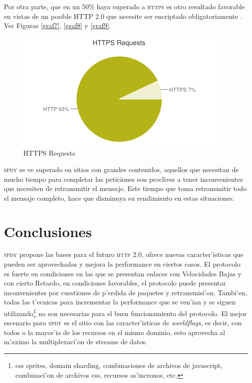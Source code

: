 \documentclass[a4paper,11pt,twocolumn]{article}
\begin{document}
Por otra parte, que en un 50\% haya superado a \textsc{https} es otro resultado favorable en vistas de un posible HTTP 2.0 \cite{http2} que necesite ser encriptado obligatoriamente \cite{art1http2} \cite{art2http2} \cite{art3http2}. Ver Figuras \ref{graf7}, \ref{graf8} y \ref{graf9}.

\begin{figure}[h]
  	\centering
	\includegraphics[scale=0.53]{httpvshttps}
	\caption{\small HTTPS Requests}
	\label{httpvsthhps}
\end{figure}

\textsc{spdy} se ve superado en sitios con grandes contenidos, aquellos que necesitan de mucho tiempo para completar las peticiones son proclives a tener inconvenientes que necesiten de retransmitir el mensaje. Este tiempo que toma retransmitir todo el mensaje completo, hace que disminuya su rendimiento en estas situaciones.

\section{Conclusiones}

\textsc{spdy} propone las bases para el futuro \textsc{http 2.0}, ofrece nuevas caracter'isticas que pueden ser aprovechadas y mejora la performance en ciertos casos. El protocolo es fuerte en condiciones en las que se presentan enlaces con Velocidades Bajas y con cierto Retardo, en condiciones favorables, el protocolo puede presentar inconvenientes por cuestiones de p'erdida de paquetes y retransmisi'on. Tambi'en, todas las t'ecnicas para incrementar la performance que se ven'ian y se siguen utilizando\footnote{css sprites, domain sharding, combinaciones de archivos de javascript, combinaci'on de archivos css, recursos as'incronos, etc.} no son necesarias para el buen funcionamiento del protocolo. El mejor escenario para \textsc{spdy} es el sitio con las caracter'isticas de \emph{worldflags}, es decir, con todos o la mayor'ia de los recursos en el mismo dominio, esto aprovecha al m'aximo la multiplexaci'on de streams de datos.
\end{document}
